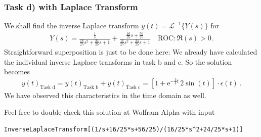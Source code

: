 \subsubsection{Task d) with Laplace Transform}
We shall find the inverse Laplace transform $y(t) = \mathcal{L}^{-1}\{Y(s)\}$
for
\begin{align}
Y(s) = \frac{\frac{1}{s}}{\frac{16}{25} s^2 + \frac{24}{25} s + 1}+
\frac{\frac{16}{25} s + \frac{56}{25}}{\frac{16}{25} s^2 + \frac{24}{25} s + 1}
\quad \text{ROC}: \Re(s) > 0.
\end{align}
Straightforward superposition is just to be done here:
We already have calculated the individual inverse Laplace transforms in task b
and c. So the solution becomes
\begin{align}
\boxed{y(t)_\text{Task d} = y(t)_\text{Task b} + y(t)_\text{Task c}
= \left[1+\mathrm{e}^{-\frac{3}{4} t} \, 2 \sin(t) \right] \cdot \epsilon(t)
}\,.
\end{align}
We have observed this characteristics in the time domain as well.

Feel free to double check this solution at Wolfram Alpha with input
\begin{verbatim}
InverseLaplaceTransform[(1/s+16/25*s+56/25)/(16/25*s^2+24/25*s+1)]
\end{verbatim}


